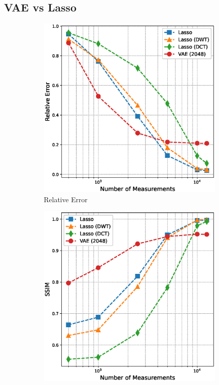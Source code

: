 \subsection{VAE vs Lasso}
\begin{figure}[h!]
    \centering
    \begin{subfigure}[b]{0.49\textwidth}
        \includegraphics[width=\textwidth]{figures/06_results/vae_benchmark/vae_vs_lasso/vae_vs_lasso_relative_error.eps}
        \caption{Relative Error}
    \end{subfigure}
    \begin{subfigure}[b]{0.49\textwidth}
        \includegraphics[width=\textwidth]{figures/06_results/vae_benchmark/vae_vs_lasso/vae_vs_lasso_ssim.eps}

\end{subfigure}
\end{figure}
